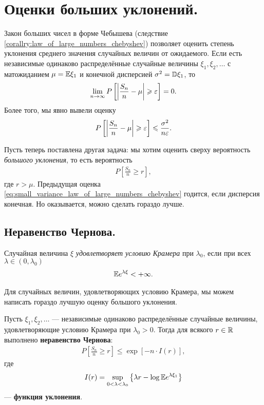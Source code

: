 \documentclass[../main.tex]{subfiles}
\begin{document}
\newpage
\section{Оценки больших уклонений.}

Закон больших чисел в форме Чебышева (следствие \ref{corallry:law_of_large_numbers_chebyshev}) позволяет оценить степень уклонения среднего значения случайных величин от ожидаемого. Если есть независимые одинаково распределённые случайные величины $ \xi_1, \xi_2, \ldots $ с матожиданием $ \mu = \mathbb E\xi_1 $ и конечной дисперсией $ \sigma^{2}=\mathbb D\xi_1 $, то
\begin{align*}
 \lim_{n \to \infty} P\left[\left|\frac{S_n}{n}  - \mu \right| \geqslant \varepsilon\right] = 0.
\end{align*} Более того, мы явно вывели оценку
\begin{align}
 \label{eq:small_variance_law_of_large_numbers_chebyshev}
 P \left[ \left| \frac{S_n}{n}-\mu \right| \geqslant \varepsilon \right] \leqslant \frac{\sigma^{2}}{n\varepsilon}.
\end{align}

Пусть теперь поставлена другая задача: мы хотим оценить сверху вероятность \textit{большого уклонения}, то есть вероятность
\begin{align*}
 P \left[ \frac{S_n}{n} \geqslant r \right],
\end{align*} где $ r > \mu $. Предыдущая оценка \eqref{eq:small_variance_law_of_large_numbers_chebyshev} годится, если дисперсия конечная. Но оказывается, можно сделать гораздо лучше.

\subsection{Неравенство Чернова.}

\begin{df}
 Случайная величина $ \xi $ \textit{удовлетворяет условию Крамера} при $ \lambda_0 $, если при всех $ \lambda \in (0,\lambda_0) $
 \begin{align*}
  \mathbb E e^{\lambda\xi} < +\infty.
 \end{align*}
\end{df}

Для случайных величин, удовлетворяющих условию Крамера, мы можем написать гораздо лучшую оценку большого уклонения.

\begin{prop}
 \label{proposition:chernoff_bound}
 Пусть $ \xi_1,\xi_2, \ldots $ --- независимые одинаково распределённые случайные величины, удовлетворяющие условию Крамера при $ \lambda_0 > 0 $. Тогда для всякого $ r \in \mathbb{R} $ выполнено \textbf{неравенство Чернова}:
 \begin{align}
  \label{eq:chernoff_bound}
  P \left[ \frac{S_n}{n} \geqslant r \right] \leqslant \exp \left[ -n \cdot I(r) \right],
 \end{align} где
 \begin{align*}
  I(r) = \sup_{0 < \lambda < \lambda_0} \left\{ \lambda r - \log \mathbb E e^{\lambda\xi_1} \right\}
 \end{align*} --- \textbf{функция уклонения}.
\end{prop}
\end{document}
